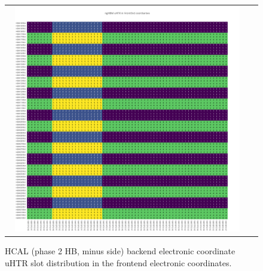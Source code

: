 \begin{figure}[htb]
 \begin{center}
  \begin{tabular}{cc}
   \includegraphics[angle=0,width=0.95\textwidth]{figures/appendix/ngHBM_uHTR_in_FrontEnd.png}
  \end{tabular}
  \caption{HCAL (phase 2 HB, minus side) backend electronic coordinate uHTR slot distribution in the frontend electronic coordinates.}
  \label{fig:lmapngHBMuHTRFEC}
 \end{center}
\end{figure}
\clearpage


